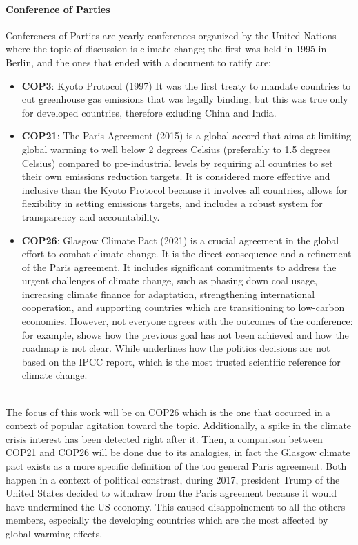 \paragraph{Conference of Parties}
Conferences of Parties are yearly conferences organized by the United Nations where the topic of discussion is climate change; the first was held in 1995 in Berlin, and the ones that ended with a document to ratify are:
\begin{itemize}
    \item \textbf{COP3}: Kyoto Protocol (1997) It was the first treaty to mandate countries to cut greenhouse gas emissions that was legally binding, but this was true only for developed countries, therefore exluding China and India.
    \item \textbf{COP21}: The Paris Agreement (2015) is a global accord that aims at limiting global warming to well below 2 degrees Celsius (preferably to 1.5 degrees Celsius) compared to pre-industrial levels by requiring all countries to set their own emissions reduction targets. It is considered more effective and inclusive than the Kyoto Protocol because it involves all countries, allows for flexibility in setting emissions targets, and includes a robust system for transparency and accountability.
    \item \textbf{COP26}: Glasgow Climate Pact (2021) is a crucial agreement in the global effort to combat climate change. It is the direct consequence and a refinement of the Paris agreement. It includes significant commitments to address the urgent challenges of climate change, such as phasing down coal usage, increasing climate finance for adaptation, strengthening international cooperation, and supporting countries which are transitioning to low-carbon economies. However, not everyone agrees with the outcomes of the conference: for example, \cite{arora_cop26_2021} shows how the previous goal has not been 
 achieved and how the roadmap is not clear. While \cite{layna_promises_2022} underlines how the politics decisions are not based on the IPCC report, which is the most trusted scientific reference for climate change. 

\end{itemize}


\\
The focus of this work will be on COP26 which is the one that occurred in a context of popular agitation toward the topic. Additionally, a spike in the climate crisis interest has been detected right after it. Then, a comparison between COP21 and COP26 will be done due to its analogies, in fact the Glasgow climate pact exists as a more specific definition of the too general Paris agreement. Both happen in a context of political constrast, during 2017,  president Trump of  the United States  decided to withdraw from the Paris agreement because it would have undermined the US economy. This caused disappoinement to all the others members, especially the developing countries which are the most affected by global warming effects.
\\

